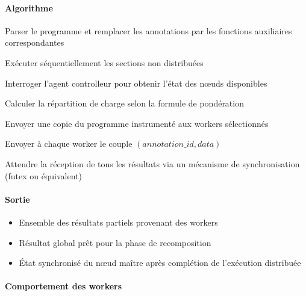 \documentclass[12pt,a4paper]{report}
\theoremstyle{definition}
\begin{document}
\paragraph{Algorithme}

\begin{algorithm}[H]
\caption{Processus de décomposition des calculs}
\label{alg:decomposition_calculs}

\begin{algorithmic}[1]

\State Parser le programme et remplacer les annotations par les fonctions auxiliaires correspondantes

\State Exécuter séquentiellement les sections non distribuées


    \State Interroger l'agent controlleur pour obtenir l’état des nœuds disponibles

    \State Calculer la répartition de charge selon la formule de pondération

    \State Envoyer une copie du programme instrumenté aux workers sélectionnés

    \State Envoyer à chaque worker le couple $(annotation\_id, data)$

\EndFor

\State Attendre la réception de tous les résultats via un mécanisme de synchronisation (futex ou équivalent)

\end{algorithmic}
\end{algorithm}

\paragraph{Sortie}
\begin{itemize}
    \item[$\bullet$] Ensemble des résultats partiels provenant des workers
    \item [$\bullet$]Résultat global prêt pour la phase de recomposition
    \item [$\bullet$]État synchronisé du nœud maître après complétion de l’exécution distribuée
\end{itemize}

\paragraph{Comportement des workers}
\end{document}
